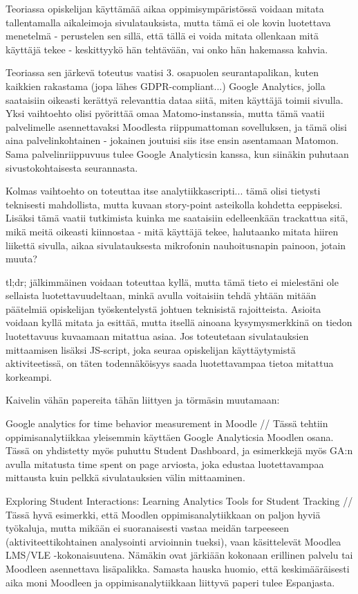 Teoriassa opiskelijan käyttämää aikaa oppimisympäristössä voidaan mitata tallentamalla aikaleimoja sivulatauksista, mutta tämä ei ole kovin luotettava menetelmä - perustelen sen sillä, että tällä ei voida mitata ollenkaan mitä käyttäjä tekee - keskittyykö hän tehtävään, vai onko hän hakemassa kahvia.

Teoriassa sen järkevä toteutus vaatisi 3. osapuolen seurantapalikan, kuten kaikkien rakastama (jopa lähes GDPR-compliant...) Google Analytics, jolla saataisiin oikeasti kerättyä relevanttia dataa siitä, miten käyttäjä toimii sivulla. Yksi vaihtoehto olisi pyörittää omaa Matomo-instanssia, mutta tämä vaatii palvelimelle asennettavaksi Moodlesta riippumattoman  sovelluksen, ja tämä olisi aina palvelinkohtainen - jokainen joutuisi siis itse ensin asentamaan Matomon. Sama palvelinriippuvuus tulee Google Analyticsin kanssa, kun siinäkin puhutaan sivustokohtaisesta seurannasta.

Kolmas vaihtoehto on toteuttaa itse analytiikkascripti... tämä olisi tietysti teknisesti mahdollista, mutta kuvaan story-point asteikolla kohdetta eeppiseksi. Lisäksi tämä vaatii tutkimista kuinka me saataisiin edelleenkään trackattua sitä, mikä meitä oikeasti kiinnostaa - mitä käyttäjä tekee, halutaanko mitata hiiren liikettä sivulla, aikaa sivulatauksesta mikrofonin nauhoitusnapin painoon, jotain muuta?

tl;dr; jälkimmäinen voidaan toteuttaa kyllä, mutta tämä tieto ei mielestäni ole sellaista luotettavuudeltaan, minkä avulla voitaisiin tehdä yhtään mitään päätelmiä opiskelijan työskentelystä johtuen teknisistä rajoitteista. Asioita voidaan kyllä mitata ja esittää, mutta itsellä ainoana kysymysmerkkinä on tiedon luotettavuus kuvaamaan mitattua asiaa. Jos toteutetaan sivulatauksien mittaamisen lisäksi JS-script, joka seuraa opiskelijan käyttäytymistä aktiviteetissä, on täten todennäköisyys saada luotettavampaa tietoa mitattua korkeampi.

Kaivelin vähän papereita tähän liittyen ja törmäsin muutamaan:

Google analytics for time behavior measurement in Moodle \citep{filvaGoogleAnalyticsTime2014} // Tässä tehtiin oppimisanalytiikkaa yleisemmin käyttäen Google Analyticsia Moodlen osana. Tässä on yhdistetty myös puhuttu Student Dashboard, ja esimerkkejä myös GA:n avulla mitatusta time spent on page arviosta, joka edustaa  luotettavampaa mittausta kuin pelkkä sivulatauksien välin mittaaminen.

Exploring Student Interactions: Learning Analytics Tools for Student Tracking \citep{condeExploringStudentInteractions2015} // Tässä hyvä esimerkki, että Moodlen oppimisanalytiikkaan on paljon hyviä työkaluja, mutta mikään ei suoranaisesti vastaa meidän tarpeeseen (aktiviteettikohtainen analysointi arvioinnin tueksi), vaan käsittelevät Moodlea LMS/VLE -kokonaisuutena. Nämäkin ovat järkiään kokonaan erillinen palvelu tai Moodleen asennettava lisäpalikka. Samasta hauska huomio, että keskimääräisesti aika moni Moodleen ja oppimisanalytiikkaan liittyvä paperi tulee Espanjasta.

